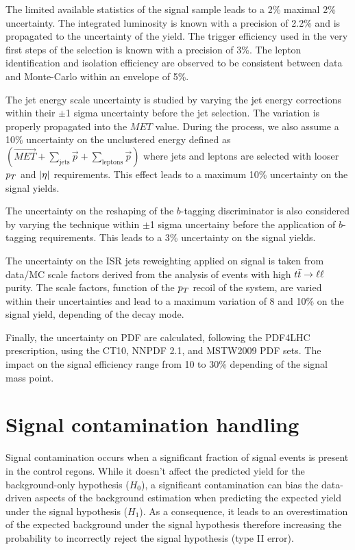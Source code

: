         The limited available statistics of the signal sample leads to a 2\% maximal
        2\% uncertainty. The integrated luminosity is known with a precision of 2.2\%
        and is propagated to the uncertainty of the yield. The trigger efficiency
        used in the very first steps of the selection is known with a precision of 3\%.
        The lepton identification and isolation efficiency are observed to be consistent
        between data and Monte-Carlo within an envelope of 5\%.

        The jet energy scale uncertainty is studied by varying the jet energy corrections
        within their $\pm$1 sigma uncertainty before the jet selection. The variation is
        properly propagated into the $MET$ value. During the process, we also assume a 
        10\% uncertainty on the unclustered energy defined as $(\vec{MET} + \sum_\text{jets}
        \vec{p} + \sum_\text{leptons} \vec{p})$ where jets and leptons are selected with looser
        $p_T$ and $\left| \eta \right|$ requirements. This effect leads to a maximum 10\% uncertainty on
        the signal yields.

        The uncertainty on the reshaping of the $b$-tagging discriminator is also considered
        by varying the technique within $\pm$1 sigma uncertainy before the application of
        $b$-tagging requirements. This leads to a 3\% uncertainty on the signal yields.

        The uncertainty on the ISR jets reweighting applied on signal is taken from data/MC
        scale factors derived from the analysis of events with high $t\bar{t} \rightarrow \ell \ell$ purity. The
        scale factors, function of the $p_T$ recoil of the system, are varied within their
        uncertainties and lead to a maximum variation of 8 and 10\% on the signal yield, depending
        of the decay mode.

        Finally, the uncertainty on PDF are calculated, following the PDF4LHC prescription,
        using the CT10, NNPDF 2.1, and MSTW2009 PDF sets.  The impact on the
        signal efficiency range from 10 to 30\% depending of the signal mass point. 

    \section{Signal contamination handling}

        Signal contamination occurs when a significant fraction of signal events is present in
        the control regons. While it doesn't affect the predicted yield for the background-only hypothesis
        ($H_0$), a significant contamination can bias the data-driven aspects of the background
        estimation when predicting the expected yield under the signal hypothesis ($H_1$). As a
        consequence, it leads to an overestimation of the expected background under the signal hypothesis
        therefore increasing the probability to incorrectly reject the signal hypothesis (type II error).
        
